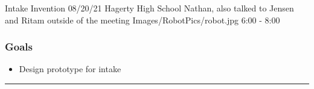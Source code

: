 \insertmeeting 
	{Intake Invention} 
	{08/20/21}
	{Hagerty High School}
	{Nathan, also talked to Jensen and Ritam outside of the meeting}
	{Images/RobotPics/robot.jpg}
	{6:00 - 8:00}
	
\subsubsection*{Goals}
\begin{itemize}
    \item Design prototype for intake

\end{itemize} 

\noindent\hfil\rule{\textwidth}{.4pt}\hfil

